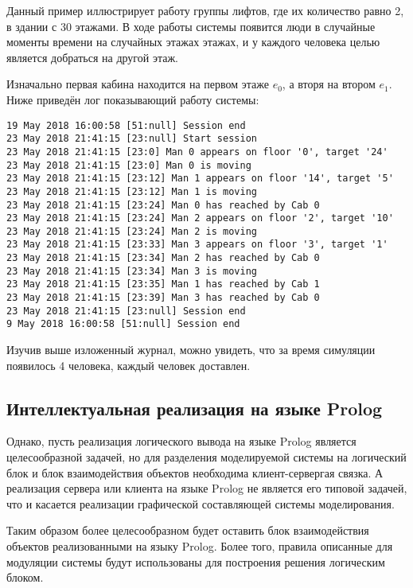 		Данный пример иллюстрирует работу группы лифтов, где их количество равно 2, в здании с 30 этажами.
			В ходе работы системы появится люди в случайные моменты времени на случайных этажах этажах,
			и у каждого человека целью является добраться на другой этаж.

		Изначально первая кабина находится на первом этаже $e_0$, а вторя на втором $e_1$.
			Ниже приведён лог показывающий работу системы:

\begin{lstlisting}
19 May 2018 16:00:58 [51:null] Session end
23 May 2018 21:41:15 [23:null] Start session
23 May 2018 21:41:15 [23:0] Man 0 appears on floor '0', target '24'
23 May 2018 21:41:15 [23:0] Man 0 is moving
23 May 2018 21:41:15 [23:12] Man 1 appears on floor '14', target '5'
23 May 2018 21:41:15 [23:12] Man 1 is moving
23 May 2018 21:41:15 [23:24] Man 0 has reached by Cab 0
23 May 2018 21:41:15 [23:24] Man 2 appears on floor '2', target '10'
23 May 2018 21:41:15 [23:24] Man 2 is moving
23 May 2018 21:41:15 [23:33] Man 3 appears on floor '3', target '1'
23 May 2018 21:41:15 [23:34] Man 2 has reached by Cab 0
23 May 2018 21:41:15 [23:34] Man 3 is moving
23 May 2018 21:41:15 [23:35] Man 1 has reached by Cab 1
23 May 2018 21:41:15 [23:39] Man 3 has reached by Cab 0
23 May 2018 21:41:15 [23:null] Session end
9 May 2018 16:00:58 [51:null] Session end
\end{lstlisting}

			Изучив выше изложенный журнал, можно увидеть, что за время симуляции появилось 4 человека,
				каждый человек доставлен.

	\subsection{Интеллектуальная реализация на языке Prolog}

		Однако, пусть реализация логического вывода на языке Prolog является целесообразной задачей, но для разделения моделируемой системы на логический блок и блок взаимодействия объектов необходима клиент-сервергая связка. А реализация сервера или клиента на языке Prolog не является его типовой задачей, что и касается реализации графической составляющей системы моделирования.

			Таким образом более целесообразном будет оставить блок взаимодействия объектов реализованными на языку Prolog.
				Более того, правила описанные для модуляции системы будут использованы
				для построения решения логическим блоком.


